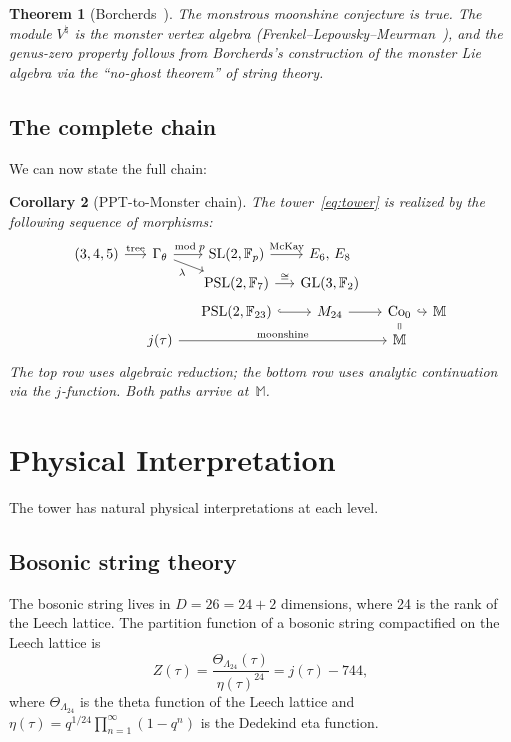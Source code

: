 \documentclass[12pt]{amsart}
\newtheorem{theorem}{Theorem}[section]
\newtheorem{corollary}[theorem]{Corollary}
\theoremstyle{definition}
\theoremstyle{remark}
\newcommand{\SL}{\mathrm{SL}}
\newcommand{\PSL}{\mathrm{PSL}}
\newcommand{\GL}{\mathrm{GL}}
\newcommand{\Fp}{\mathbb{F}_p}
\newcommand{\Gtheta}{\Gamma_\theta}
\newcommand{\Monster}{\mathbb{M}}
\begin{document}
\begin{theorem}[Borcherds~\cite{borcherds}]
The monstrous moonshine conjecture is true.  The module $V^\natural$
is the monster vertex algebra (Frenkel--Lepowsky--Meurman~\cite{flm}),
and the genus-zero property follows from Borcherds's construction of the
monster Lie algebra via the ``no-ghost theorem'' of string theory.
\end{theorem}

\subsection{The complete chain}

We can now state the full chain:

\begin{corollary}[PPT-to-Monster chain]\label{cor:chain}
The tower~\eqref{eq:tower} is realized by the following sequence of
morphisms:
\[
\begin{tikzcd}[column sep=1.2em, row sep=0.3em]
(3,4,5) \ar[r, "\text{tree}"] &
\Gtheta \ar[r, "\bmod p"] \ar[dr, "\lambda"'] &
\SL(2,\Fp) \ar[r, "\text{McKay}"] &
E_6,\, E_8 \\
& & \PSL(2,\mathbb{F}_7) \ar[r, "\cong"] &
\GL(3,\mathbb{F}_2) \\
& & \PSL(2,\mathbb{F}_{23}) \ar[r, hook] &
M_{24} \ar[r] &
\mathrm{Co}_0 \ar[r, hook] &[-0.5em] \Monster \\
& j(\tau) \ar[rrr, "\text{moonshine}"] & & &  \Monster \ar[u, equal]
\end{tikzcd}
\]
The top row uses algebraic reduction; the bottom row uses analytic
continuation via the $j$-function.  Both paths arrive at~$\Monster$.
\end{corollary}

\section{Physical Interpretation}\label{sec:physics}

The tower has natural physical interpretations at each level.

\subsection{Bosonic string theory}

The bosonic string lives in $D = 26 = 24 + 2$ dimensions, where 24 is
the rank of the Leech lattice.  The partition function of a bosonic
string compactified on the Leech lattice is
\begin{equation}\label{eq:bosonic-Z}
Z(\tau) = \frac{\Theta_{\Lambda_{24}}(\tau)}{\eta(\tau)^{24}}
= j(\tau) - 744,
\end{equation}
where $\Theta_{\Lambda_{24}}$ is the theta function of the Leech lattice
and $\eta(\tau) = q^{1/24}\prod_{n=1}^\infty (1-q^n)$ is the Dedekind
eta function.
\end{document}
